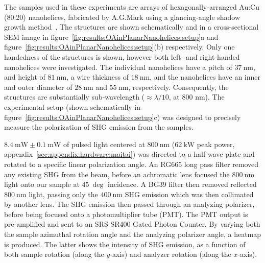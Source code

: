 The samples used in these experiments are arrays of hexagonally-arranged Au:Cu (80:20) nanohelices, fabricated by A.G.Mark using a glancing-angle shadow growth method~\cite{Gibbs2014}. The structures are shown schematically and in a cross-sectional SEM image in figure~\ref{fig:results:OAinPlanarNanohelices:setup}a and figure~\ref{fig:results:OAinPlanarNanohelices:setup}(b) respectively. 
Only one handedness of the structures is shown, however both left- and right-handed nanohelices were investigated. The individual nanohelices have a pitch of $\SI{37}{\nano\m}$, and height of $\SI{81}{\nano\m}$, a wire thickness of $\SI{18}{\nano\m}$, and the nanohelices have an inner and outer diameter of $\SI{28}{\nano\m}$ and $\SI{55}{\nano\m}$, respectively. Consequently, the structures are substantially sub-wavelength ($\approx\lambda/10$, at 800 nm).
The experimental setup (shown schematically in figure~\ref{fig:results:OAinPlanarNanohelices:setup}c) was designed to precisely measure the polarization of SHG emission from the samples. 

$\SI{8.4}{\milli\watt}\pm\SI{0.1}{\milli\watt}$ of pulsed light centered at $\SI{800}{\nano\m}$ ($\SI{62}{\kilo\watt}$ peak power, appendix~\ref{sec:appendix:hardware:maitai}) was directed to a half-wave plate and rotated to a specific linear polarization angle. An RG665 long pass filter removed any existing SHG from the beam, before an achromatic lens focused the $\SI{800}{\nano\m}$ light onto our sample at $\SI{45}{\deg}$ incidence. A BG39 filter then removed reflected $\SI{800}{\nano\m}$ light, passing only the $\SI{400}{\nano\m}$ SHG emission which was then collimated by another lens. The SHG emission then passed through an analyzing polarizer, before being focused onto a photomultiplier tube (PMT). The PMT output is pre-amplified and sent to an SRS SR400 Gated Photon Counter. 
By varying both the sample azimuthal rotation angle and the analyzing polarizer angle, a heatmap is produced. The latter shows the intensity of SHG emission, as a function of both sample rotation (along the $y$-axis) and analyzer rotation (along the $x$-axis). 

